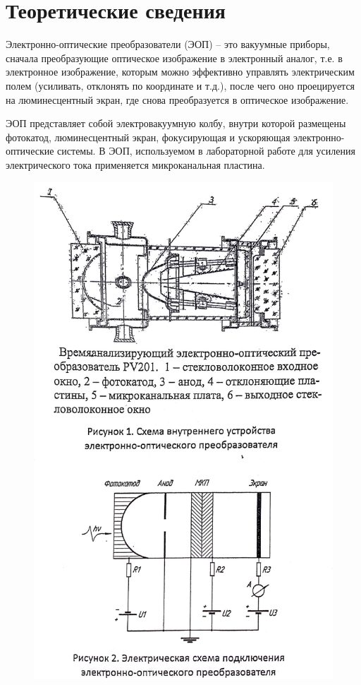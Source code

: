 \documentclass[a4paper,12pt]{article}
\begin{document}
\section*{Теоретические сведения} 	

Электронно-оптические преобразователи (ЭОП) – это вакуумные приборы, сначала преобразующие оптическое изображение в электронный аналог, т.е. в электронное изображение, которым можно эффективно управлять электрическим полем (усиливать, отклонять по координате и т.д.), после чего оно проецируется на люминесцентный экран, где снова преобразуется в оптическое изображение. 

ЭОП представляет собой электровакуумную колбу, внутри которой размещены фотокатод, люминесцентный экран,  фокусирующая и ускоряющая электронно-оптические системы. В ЭОП, используемом в лабораторной работе для усиления электрического тока применяется микроканальная пластина.

\begin{figure}[h!]
	\begin{center}
	\includegraphics[scale=0.4]{fig1}
	\end{center}
\end{figure}
\end{document}
